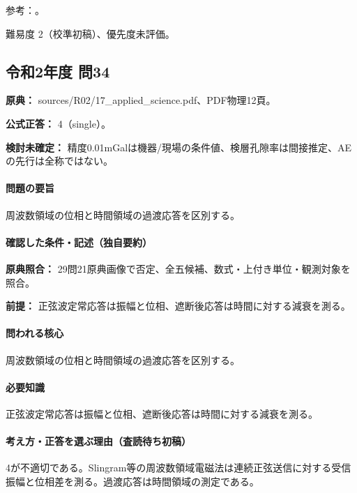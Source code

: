 \par 参考：\cite{schumann_mt2009,epa_ip,usgs_csamt2012}。

\par 難易度 2（校準初稿）、優先度未評価。

\subsection{令和2年度 問34}
\label{q:r02-reg-applied-34}

\noindent\textbf{原典：} sources/R02/17\_applied\_science.pdf、PDF物理12頁。

\textbf{公式正答：} 4（single）。

\par\textbf{検討未確定：} 精度0.01mGalは機器/現場の条件値、検層孔隙率は間接推定、AEの先行は全称ではない。

\paragraph{問題の要旨} 周波数領域の位相と時間領域の過渡応答を区別する。

\paragraph{確認した条件・記述（独自要約）}\mbox{}\par

\noindent\textbf{原典照合：} 29問21原典画像で否定、全五候補、数式・上付き単位・観測対象を照合。\par

\noindent\textbf{前提：} 正弦波定常応答は振幅と位相、遮断後応答は時間に対する減衰を測る。\par

\paragraph{問われる核心} 周波数領域の位相と時間領域の過渡応答を区別する。

\paragraph{必要知識} 正弦波定常応答は振幅と位相、遮断後応答は時間に対する減衰を測る。

\paragraph{考え方・正答を選ぶ理由（査読待ち初稿）} 4が不適切である。Slingram等の周波数領域電磁法は連続正弦送信に対する受信振幅と位相差を測る。過渡応答は時間領域の測定である。

